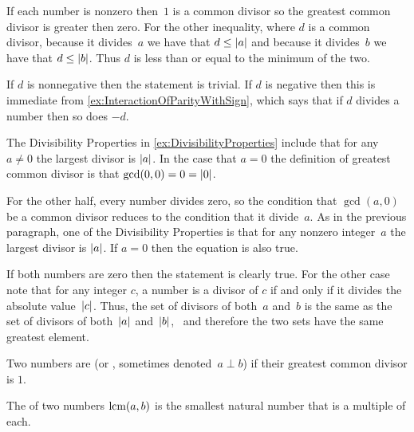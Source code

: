 \documentclass{ibl}  %
\begin{document}
\begin{ex}
\begin{ans}
\begin{exes}
  If each number is nonzero then~$1$ is a common divisor so 
  the greatest common divisor is greater then zero.
  For the other inequality,
  where $d$ is a common divisor, 
  because it divides~$a$ we have that $d\leq\lvert a\rvert$ and
  because it divides~$b$ we have that $d\leq\lvert b\rvert$.
  Thus $d$ is less than or equal to the minimum of the two. 
\item If $d$ is nonnegative then the statement is trivial.
  If $d$ is negative then
  this is immediate from \ref{ex:InteractionOfParityWithSign},
  which says that if $d$ divides a number then so does $-d$.
\item The Divisibility Properties in \ref{ex:DivisibilityProperties}
  include that for any~$a\neq 0$ the largest divisor is $\lvert a\rvert$.
  In the case that $a=0$ the definition of greatest common divisor 
  is that $\gcd(0,0)=0=\lvert0\rvert$.

  For the other half, 
  every number divides zero, so the condition that $\gcd(a,0)$ be a common
  divisor reduces to the condition that it divide~$a$.
  As in the previous paragraph, one of the Divisibility Properties  
  is that for any nonzero integer~$a$ the largest divisor is $\lvert a\rvert$.
  If $a=0$ then the equation is also true.
\item If both numbers are zero then the statement is clearly true.
  For the other case note that for any
  integer $c$, a number is a divisor of $c$ if and only if it divides 
  the absolute value~$\lvert c\rvert$.
  Thus, the set of divisors of both~$a$ and~$b$ 
  is the same as the set of divisors of both~$\lvert a\rvert$ and~$\lvert b\rvert$, \
  and therefore the two sets have the same greatest element.
\end{exes}
\end{ans}
\end{ex}

\begin{df}
Two numbers are  
(or , sometimes denoted~$a\perp b$) if their 
greatest common divisor is $1$.
\end{df}

\begin{df}
The  of two numbers $\operatorname{lcm}(a,b)$ 
is the smallest natural number that is a multiple of each.
\end{df}
\end{document}
